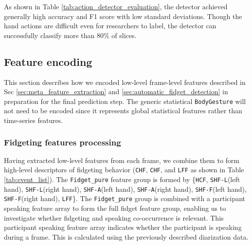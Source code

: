 As shown in Table \ref{tab:action_detector_evaluation}, the detector achieved generally high accuracy and F1 score with low standard deviations. Though the hand actions are difficult even for researchers to label, the detector can successfully classify more than 80\% of slices.
\vspace{-0.3cm}
\subsection{Feature encoding}\label{sec:feature_encoding}
This section describes how we encoded low-level frame-level features described in Sec \ref{sec:meta_feature_extraction} and \ref{sec:automatic_fidget_detection} in preparation for the final prediction step. The generic statistical \texttt{BodyGesture} will not need to be encoded since it represents global statistical features rather than time-series features.\vspace{-0.3cm}
\subsubsection{Fidgeting features processing}
Having extracted low-level features from each frame, we combine them to form high-level descriptors of fidgeting behavior (\texttt{CHF}, \texttt{CHF}, and \texttt{LFF} as shown in Table \ref{tab:event_list}). 
The \texttt{Fidget\_pure} feature group is formed by \{\texttt{HCF}, \texttt{SHF-L}(left hand), \texttt{SHF-L}(right hand), \texttt{SHF-A}(left hand), \texttt{SHF-A}(right hand), \texttt{SHF-F}(left hand), \texttt{SHF-F}(right hand), \texttt{LFF}\}. 
The \texttt{Fidget\_pure} group is combined with a participant speaking feature array to form the full fidget feature group, enabling us to investigate whether fidgeting and speaking co-occurrence is relevant.
This participant speaking feature array indicates whether the participant is speaking during a frame.
This is calculated using the previously described diarization data.


